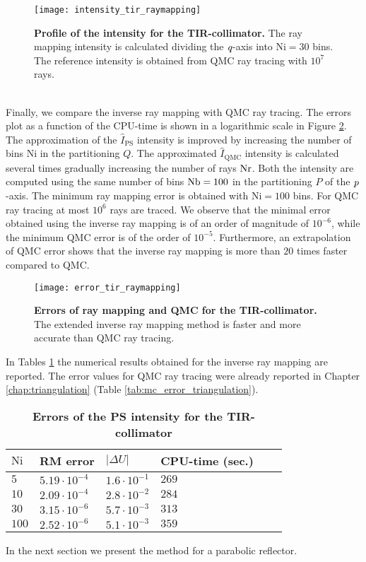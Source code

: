 \begin{figure}[t]
  \begin{center}
  \texttt{[image: intensity\_tir\_raymapping]}
  \end{center}
  \caption{\textbf{Profile of the intensity for the TIR-collimator.}
 The ray mapping intensity is calculated dividing the $\textit{q}$-axis into $\textrm{Ni}=30$ bins. The reference intensity is obtained from QMC ray tracing with $10^7$ rays.}
\label{fig:intensity_tir_raymapping}
 \end{figure}
\\ \indent 
Finally, we compare the inverse ray mapping with QMC ray tracing. The errors plot as a function of the CPU-time is shown in a logarithmic scale in Figure \ref{fig:error_tir_raymapping}. The approximation of the $\hat{I}_{\textrm{PS}}$ intensity is improved by increasing the number of bins $\textrm{Ni}$ in the partitioning $Q$. The approximated $\hat{I}_{\textrm{QMC}}$ intensity is calculated several times gradually increasing the number of rays $\textrm{Nr}$. Both the intensity are computed using the same number of bins $\textrm{Nb}=100$ in the partitioning $P$ of the $\textit{p}$-axis. The minimum ray mapping error is obtained with $\textrm{Ni}=100$ bins. For QMC ray tracing at most $10^6$ rays are traced. We observe that the minimal error obtained using the inverse ray mapping is of an order of magnitude of $10^{-6}$, while the minimum QMC error is of the order of $10^{-5}$. Furthermore, an extrapolation of QMC error shows that the inverse ray mapping is more than $20$ times faster compared to QMC.
\begin{figure}[t]
  \begin{center}
  \texttt{[image: error\_tir\_raymapping]}
  \end{center}
  \caption{\textbf{Errors of ray mapping and QMC for the TIR-collimator.}
 The extended inverse ray mapping method is faster and more accurate than QMC ray tracing.}
\label{fig:error_tir_raymapping}
 \end{figure}
In Tables \ref{tab:ray_mapping_tir} the numerical results obtained for the inverse ray mapping are reported. The error values for QMC ray tracing were already reported in Chapter \ref{chap:triangulation} (Table \ref{tab:mc_error_triangulation}).
\begin{table}[t] 
\centering
\caption{\bf Errors of the PS intensity for the TIR-collimator}
\begin{tabular}{llllll}
 \hline  $\textrm{Ni}$\;  & RM error & $|\Delta U|$ & CPU-time (sec.)\\
  \hline 
 $5$    & $5.19\cdot10^{-4}$    & $1.6\cdot 10^{-1}$ & $269$  \\
$10$    & $2.09\cdot 10^{-4}$  & $2.8\cdot 10^{-2}$ & $284$   \\
$30$    & $3.15\cdot 10^{-6}$  & $5.7 \cdot 10^{-3}$ & $313$  \\
$100$  & $2.52\cdot 10^{-6}$  & $5.1 \cdot 10^{-3}$ & $359$  \\
 \hline
 \end{tabular}
 \label{tab:ray_mapping_tir}
 \end{table}
In the next section we present the method for a parabolic reflector.
